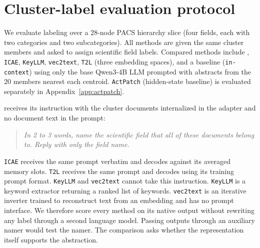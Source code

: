 \section{Cluster-label evaluation protocol}
\label{app:baseline-labels}

We evaluate labeling over a 28-node PACS hierarchy slice (four fields, each with two categories and two subcategories). 
All methods are given the same cluster members and asked to assign scientific field labels. Compared methods include \doctolora, \texttt{ICAE}, \texttt{KeyLLM}, \texttt{vec2text}, \texttt{T2L} (three embedding spaces), and a baseline (\texttt{in-context}) using only the base Qwen3-4B LLM prompted with abstracts from the 20 members nearest each centroid. \texttt{ActPatch} (hidden-state baseline) is evaluated separately in Appendix~\ref{app:actpatch}.

\doctolora receives its instruction with the cluster documents internalized in the adapter and no document text in the prompt:
\begin{quote}\itshape
In 2 to 3 words, name the scientific field that all of these documents belong to.
Reply with only the field name.
\end{quote}
\texttt{ICAE} receives the same prompt verbatim and decodes against its averaged memory slots.
\texttt{T2L} receives the same prompt and decodes using its training prompt format.
\texttt{KeyLLM} and \texttt{vec2text} cannot take this instruction.
\texttt{KeyLLM} is a keyword extractor returning a ranked list of keywords.
\texttt{vec2text} is an iterative inverter trained to reconstruct text from an embedding and has no prompt interface.
We therefore score every method on its native output without rewriting any label through a second language model.
Passing outputs through an auxiliary namer would test the namer.
The comparison asks whether the representation itself supports the abstraction.

